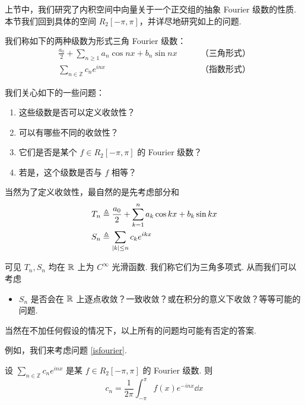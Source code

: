 上节中，我们研究了内积空间中向量关于一个正交组的抽象 Fourier 级数的性质. 本节我们回到具体的空间 $R_2[-\pi,\pi]$，并详尽地研究如上的问题.



我们称如下的两种级数为形式三角 Fourier 级数：
$$
\begin{matrix}
    \displaystyle\frac{a_0}{2}+\sum_{n\ge 1}a_n\cos nx+b_n\sin nx & \qquad\text{（三角形式）}\\
    \displaystyle\sum_{n\in\mathbb{Z}}c_ne^{inx} & \qquad\text{（指数形式）}
\end{matrix}
$$

我们关心如下的一些问题：

\begin{enumerate}
    \item 这些级数是否可以定义收敛性？
    
    \item 可以有哪些不同的收敛性？
    
    \item\label{isfourier} 它们是否是某个 $f\in R_2[-\pi,\pi]$ 的 Fourier 级数？
    
    \item 若是，这个级数是否与 $f$ 相等？
\end{enumerate}

当然为了定义收敛性，最自然的是先考虑部分和
$$
\begin{aligned}
    T_n&\triangleq\frac{a_0}{2}+\sum_{k=1}^na_k\cos kx+b_k\sin kx\\
    S_n&\triangleq\sum_{\left\lvert{k}\right\rvert\le n}c_ke^{ikx}
\end{aligned}
$$

可见 $T_n,S_n$ 均在 $\mathbb{R}$ 上为 $C^\infty$ 光滑函数. 我们称它们为三角多项式. 从而我们可以考虑

\begin{itemize}
    \item $S_n$ 是否会在 $\mathbb{R}$ 上逐点收敛？一致收敛？或在积分的意义下收敛？等等可能的问题.
\end{itemize}

当然在不加任何假设的情况下，以上所有的问题均可能有否定的答案.

例如，我们来考虑问题 \ref{isfourier}.

设 $\displaystyle\sum_{n\in\mathbb{Z}}c_ne^{inx}$ 是某 $f\in R_2[-\pi,\pi]$ 的 Fourier 级数. 则
$$
c_n=\frac{1}{2\pi}\int_{-\pi}^{\pi}f(x)e^{-inx}\dd x
$$

